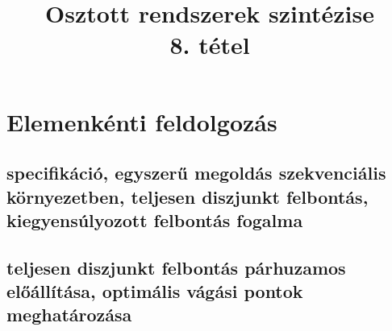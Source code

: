 \documentclass{article}
\title{Osztott rendszerek szintézise\\8. tétel}
\begin{document}

\section*{Elemenkénti feldolgozás}
\subsection{specifikáció, egyszerű megoldás szekvenciális környezetben, teljesen diszjunkt felbontás, kiegyensúlyozott felbontás fogalma}

\subsection{teljesen diszjunkt felbontás párhuzamos előállítása, optimális vágási pontok meghatározása}
\end{document}
